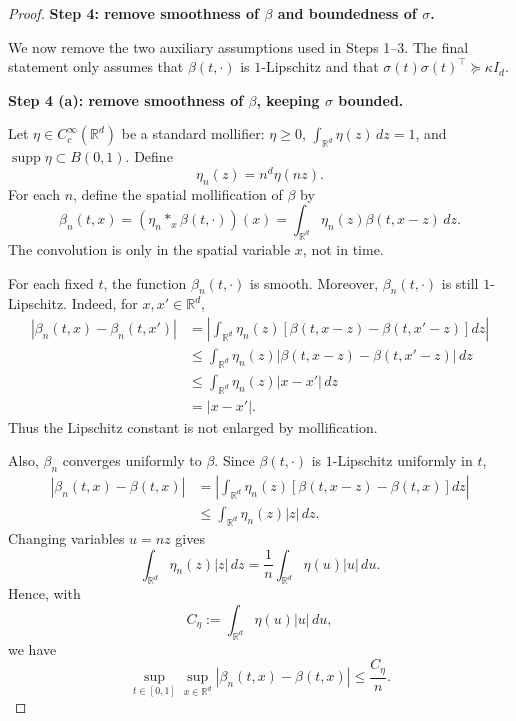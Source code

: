 \documentclass{article}
\newcommand{\1}{\mathbbm{1}}
\numberwithin{equation}{section}
\begin{document}
\begin{proof}
\medskip

\textbf{Step 4: remove smoothness of $\beta$ and boundedness of $\sigma$.}

We now remove the two auxiliary assumptions used in Steps 1--3. The final
statement only assumes that $\beta(t,\cdot)$ is $1$-Lipschitz and that
$\sigma(t)\sigma(t)^\top\succeq \kappa I_d$.

\medskip

\textbf{Step 4 (a): remove smoothness of $\beta$, keeping $\sigma$ bounded.}

Let $\eta\in C_c^\infty(\mathbb R^d)$ be a standard mollifier:
$\eta\ge0$, $\int_{\mathbb R^d}\eta(z)\,dz=1$, and
$\operatorname{supp}\eta\subset B(0,1)$. Define
$$
\eta_n(z)=n^d\eta(nz).
$$
For each $n$, define the spatial mollification of $\beta$ by
$$
\beta_n(t,x)
=
(\eta_n\ast_x \beta(t,\cdot))(x)
=
\int_{\mathbb R^d}\eta_n(z)\beta(t,x-z)\,dz.
$$
The convolution is only in the spatial variable $x$, not in time.

For each fixed $t$, the function $\beta_n(t,\cdot)$ is smooth. Moreover,
$\beta_n(t,\cdot)$ is still $1$-Lipschitz. Indeed, for $x,x'\in\mathbb R^d$,
$$
\begin{aligned}
|\beta_n(t,x)-\beta_n(t,x')|
&=
\left|
\int_{\mathbb R^d}\eta_n(z)
\left[
\beta(t,x-z)-\beta(t,x'-z)
\right]dz
\right|  \\
&\le
\int_{\mathbb R^d}\eta_n(z)
|\beta(t,x-z)-\beta(t,x'-z)|\,dz  \\
&\le
\int_{\mathbb R^d}\eta_n(z)|x-x'|\,dz  \\
&=
|x-x'|.
\end{aligned}
$$
Thus the Lipschitz constant is not enlarged by mollification.

Also, $\beta_n$ converges uniformly to $\beta$. Since $\beta(t,\cdot)$ is
$1$-Lipschitz uniformly in $t$,
$$
\begin{aligned}
|\beta_n(t,x)-\beta(t,x)|
&=
\left|
\int_{\mathbb R^d}\eta_n(z)
\left[
\beta(t,x-z)-\beta(t,x)
\right]dz
\right| \\
&\le
\int_{\mathbb R^d}\eta_n(z)|z|\,dz.
\end{aligned}
$$
Changing variables $u=nz$ gives
$$
\int_{\mathbb R^d}\eta_n(z)|z|\,dz
=
\frac1n\int_{\mathbb R^d}\eta(u)|u|\,du.
$$
Hence, with
$$
C_\eta:=\int_{\mathbb R^d}\eta(u)|u|\,du,
$$
we have
$$
\sup_{t\in[0,1]}\sup_{x\in\mathbb R^d}
|\beta_n(t,x)-\beta(t,x)|
\le
\frac{C_\eta}{n}.
$$


\end{proof}
\end{document}

